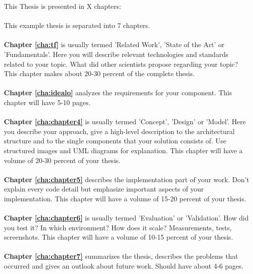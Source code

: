 This Thesis is presented in X chapters:
\\
\\
\noindent This example thesis is separated into 7 chapters.
\\
\\
\textbf{Chapter \ref{cha:tf}} is usually termed 'Related Work', 'State of the Art' or 'Fundamentals'. Here you will describe relevant technologies and standards related to your topic. What did other scientists propose regarding your topic? This chapter makes about 20-30 percent of the complete thesis.
\\
\\
\textbf{Chapter \ref{cha:idealo}} analyzes the requirements for your component. This chapter will have 5-10 pages.
\\
\\
\textbf{Chapter \ref{cha:chapter4}} is usually termed 'Concept', 'Design' or 'Model'. Here you describe your approach, give a high-level description to the architectural structure and to the single components that your solution consists of. Use structured images and UML diagrams for explanation. This chapter will have a volume of 20-30 percent of your thesis.
\\
\\
\textbf{Chapter \ref{cha:chapter5}} describes the implementation part of your work. Don't explain every code detail but emphasize important aspects of your implementation. This chapter will have a volume of 15-20 percent of your thesis.
\\
\\
\textbf{Chapter \ref{cha:chapter6}} is usually termed 'Evaluation' or 'Validation'. How did you test it? In which environment? How does it scale? Measurements, tests, screenshots. This chapter will have a volume of 10-15 percent of your thesis.
\\
\\
\textbf{Chapter \ref{cha:chapter7}} summarizes the thesis, describes the problems that occurred and gives an outlook about future work. Should have about 4-6 pages.